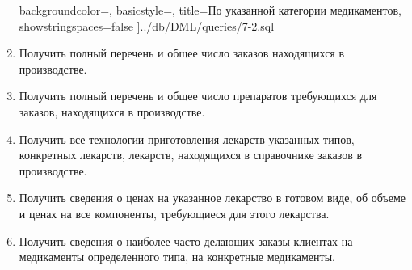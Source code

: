 \documentclass[a4paper]{article}
\begin{document}
\begin{enumerate}
					backgroundcolor=\color{backcolour},
					basicstyle=\scriptsize,
					title={По указанной категории медикаментов},
					showstringspaces=false
				]{../db/DML/queries/7-2.sql}
			\item Получить полный перечень и общее число заказов находящихся в производстве.
				
				
			\item Получить полный перечень и общее число препаратов требующихся для заказов, находящихся в производстве.
				
				
			\item Получить все технологии приготовления лекарств указанных типов, конкретных лекарств, лекарств, находящихся в справочнике заказов в производстве.
				
				
				
			\item Получить сведения о ценах на указанное лекарство в готовом виде, об объеме и ценах на все компоненты, требующиеся для этого лекарства.
				
			\item Получить сведения о наиболее часто делающих заказы клиентах на медикаменты определенного типа, на конкретные медикаменты.

\end{enumerate}
\end{document}
